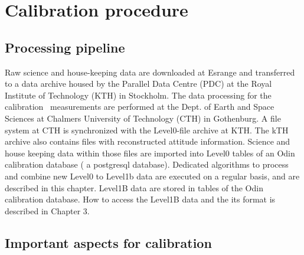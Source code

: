 


\chapter{Calibration procedure}
\label{chapter:calibration}




\section{Processing pipeline}

Raw science and house-keeping data are downloaded at
Esrange and transferred to a data archive housed by the Parallel
Data Centre (PDC) at the Royal Institute of Technology (KTH)
in Stockholm. The data processing for the calibration \smr\
measurements are performed at the Dept. of Earth and Space
Sciences at Chalmers University of Technology (CTH) in Gothenburg.
A file system at CTH is synchronized with the Level0-file archive 
at KTH. The kTH archive also contains files with reconstructed attitude
information.  Science and house keeping data within those files
are imported into Level0 tables of an Odin calibration database
( a postgresql database). 
Dedicated algorithms to process and combine new Level0 to Level1b
data are executed on a regular basis, and are described in this
chapter. Level1B data are stored in tables of the Odin calibration database.  
How to access the Level1B data and the its format is described
in Chapter 3.




\section{Important aspects for calibration}


